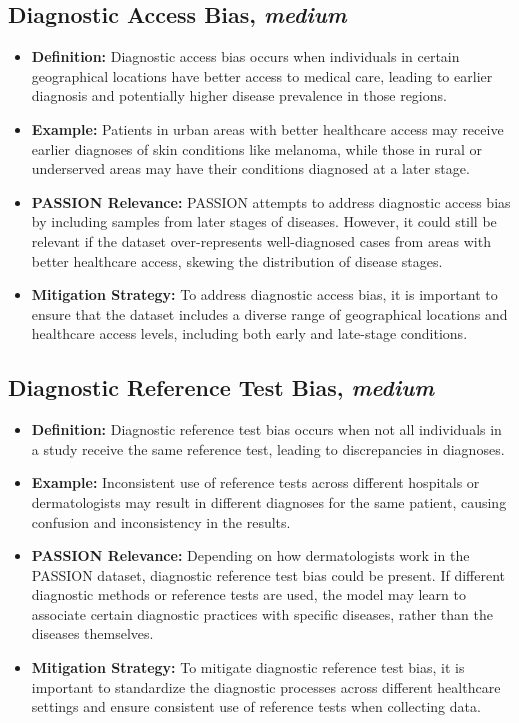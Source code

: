 \begin{refsection}
		\subsection{Diagnostic Access Bias, \textit{medium}}
		\begin{itemize}
			\item \textbf{Definition:} Diagnostic access bias occurs when individuals in certain geographical locations have better access to medical care, leading to earlier diagnosis and potentially higher disease prevalence in those regions.
			\item \textbf{Example:} Patients in urban areas with better healthcare access may receive earlier diagnoses of skin conditions like melanoma, while those in rural or underserved areas may have their conditions diagnosed at a later stage.
			\item \textbf{PASSION Relevance:} PASSION attempts to address diagnostic access bias by including samples from later stages of diseases. However, it could still be relevant if the dataset over-represents well-diagnosed cases from areas with better healthcare access, skewing the distribution of disease stages.
			\item \textbf{Mitigation Strategy:} To address diagnostic access bias, it is important to ensure that the dataset includes a diverse range of geographical locations and healthcare access levels, including both early and late-stage conditions.
		\end{itemize}
		
		\subsection{Diagnostic Reference Test Bias, \textit{medium}}
		\begin{itemize}
			\item \textbf{Definition:} Diagnostic reference test bias occurs when not all individuals in a study receive the same reference test, leading to discrepancies in diagnoses.
			\item \textbf{Example:} Inconsistent use of reference tests across different hospitals or dermatologists may result in different diagnoses for the same patient, causing confusion and inconsistency in the results.
			\item \textbf{PASSION Relevance:} Depending on how dermatologists work in the PASSION dataset, diagnostic reference test bias could be present. If different diagnostic methods or reference tests are used, the model may learn to associate certain diagnostic practices with specific diseases, rather than the diseases themselves.
			\item \textbf{Mitigation Strategy:} To mitigate diagnostic reference test bias, it is important to standardize the diagnostic processes across different healthcare settings and ensure consistent use of reference tests when collecting data.
		\end{itemize}
		

\end{refsection}
